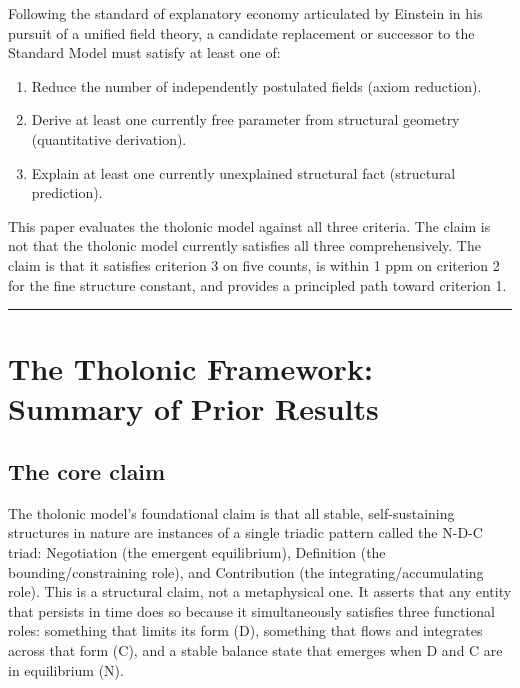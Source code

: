 \documentclass[12pt]{article}
\providecommand{\tightlist}{%
  \setlength{\itemsep}{0pt}\setlength{\parskip}{0pt}}
\begin{document}
Following the standard of explanatory economy articulated by Einstein in
his pursuit of a unified field theory, a candidate replacement or
successor to the Standard Model must satisfy at least one of:

\begin{enumerate}
\def\labelenumi{\arabic{enumi}.}
\tightlist
\item
  Reduce the number of independently postulated fields (axiom
  reduction).
\item
  Derive at least one currently free parameter from structural geometry
  (quantitative derivation).
\item
  Explain at least one currently unexplained structural fact (structural
  prediction).
\end{enumerate}

This paper evaluates the tholonic model against all three criteria. The
claim is not that the tholonic model currently satisfies all three
comprehensively. The claim is that it satisfies criterion 3 on five
counts, is within 1 ppm on criterion 2 for the fine structure constant,
and provides a principled path toward criterion 1.

\begin{center}\rule{0.5\linewidth}{0.5pt}\end{center}

\section{The Tholonic Framework: Summary of Prior Results}\label{the-tholonic-framework-summary-of-prior-results}

\subsection{The core claim}\label{the-core-claim}

The tholonic model's foundational claim is that all stable,
self-sustaining structures in nature are instances of a single triadic
pattern called the N-D-C triad: Negotiation (the emergent equilibrium),
Definition (the bounding/constraining role), and Contribution (the
integrating/accumulating role). This is a structural claim, not a
metaphysical one. It asserts that any entity that persists in time does
so because it simultaneously satisfies three functional roles: something
that limits its form (D), something that flows and integrates across
that form (C), and a stable balance state that emerges when D and C are
in equilibrium (N).
\end{document}
